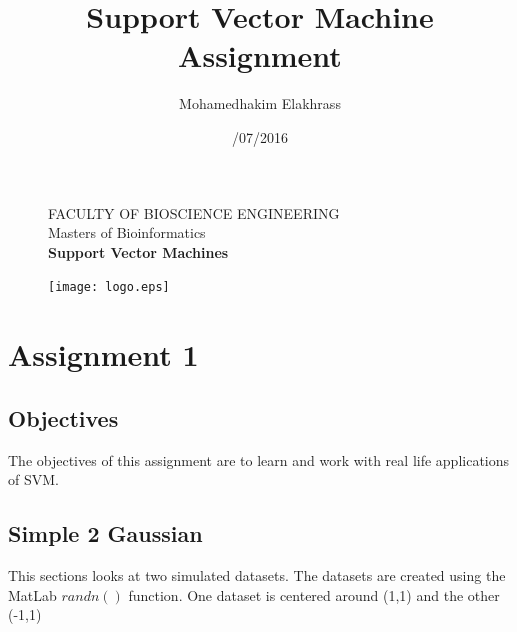 \documentclass[11pt,oneside,a4paper]{article}
\title{\vspace*{40.0mm}
  \bf\sf Support Vector Machine Assignment 
         \vspace*{20.0mm} \\
  \vspace*{40.0mm}
  }
\author{\sf Mohamedhakim Elakhrass}
\date{\sf 15/07/2016}
\makeatletter
\def\cleardoublepage{\clearpage\if@twoside \ifodd\c@page\else%
\hbox{}%
\thispagestyle{empty}%
\clearpage%
\if@twocolumn\hbox{}\clearpage\fi\fi\fi}
\makeatother
\begin{document}
	
	
\begin{figure}
  \parbox[t]{125mm}{
    \vspace*{6mm}
    \scriptsize\sf           FACULTY OF BIOSCIENCE ENGINEERING\\
    \scriptsize\sf           Masters of Bioinformatics \\
    \scriptsize\sf\bfseries  Support Vector Machines \\}
  \parbox[t]{40mm}{
    \begin{flushright}
      \texttt{[image: logo.eps]}
    \end{flushright}}
\end{figure}

\maketitle
\thispagestyle{empty}
\raggedbottom

\cleardoublepage
{}
\setcounter{tocdepth}{2}
\tableofcontents
\cleardoublepage
{}

\cleardoublepage

\section{Assignment 1}
\subsection{Objectives}
The objectives of this assignment are to learn and work with real life applications of SVM. 
\subsection{Simple 2 Gaussian}
This sections looks at two simulated datasets. The datasets are created using the MatLab $randn()$ function. One dataset is centered around (1,1) and the other (-1,1)\\
\end{document}
